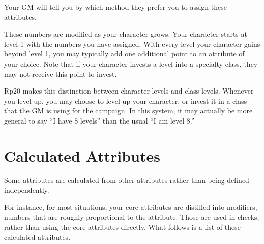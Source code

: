 Your GM will tell you by which method they prefer you to assign these attributes.

These numbers are modified as your character grows. Your character starts at level 1 with the numbers you have assigned. With every level your character gains beyond level 1, you may typically add one additional point to an attribute of your choice. Note that if your character invests a level into a specialty class, they may not receive this point to invest.

Rp20 makes this distinction between character levels and class levels. Whenever you level up, you may choose to level up your character, or invest it in a class that the GM is using for the campaign. In this system, it may actually be more general to say ``I have 8 levels'' than the usual ``I am level 8.''

\section{Calculated Attributes}
Some attributes are calculated from other attributes rather than being defined independently. 

For instance, for most situations, your core attributes are distilled into modifiers, numbers that are roughly proportional to the attribute. Those are used in checks, rather than using the core attributes directly. What follows is a list of these calculated attributes.

